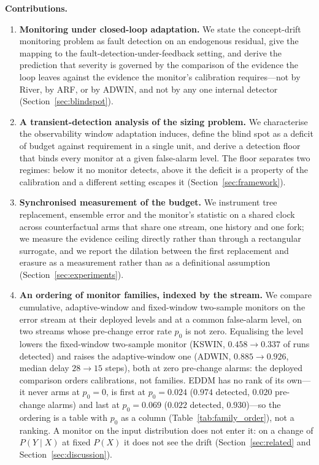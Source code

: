 

\noindent\textbf{Contributions.}
\begin{enumerate}[nosep, label=\textbf{(C\arabic*)}]
  \item \textbf{Monitoring under closed-loop adaptation.} We state the concept-drift monitoring
  problem as fault detection on an endogenous residual, give the mapping to the
  fault-detection-under-feedback setting, and derive the prediction that severity is governed by
  the comparison of the evidence the loop leaves against the evidence the monitor's calibration
  requires---not by River, by ARF, or by ADWIN, and not by any one internal detector
  (Section~\ref{sec:blindspot}).
  \item \textbf{A transient-detection analysis of the sizing problem.} We characterise the
  observability window adaptation induces, define the blind spot as a deficit of budget against
  requirement in a single unit, and derive a detection floor that binds every monitor at a given
  false-alarm level. The floor separates two regimes: below it no monitor detects, above it the
  deficit is a property of the calibration and a different setting escapes it
  (Section~\ref{sec:framework}).
  \item \textbf{Synchronised measurement of the budget.} We instrument tree replacement, ensemble
  error and the monitor's statistic on a shared clock across counterfactual arms that share one
  stream, one history and one fork; we measure the evidence ceiling directly rather than through a
  rectangular surrogate, and we report the dilation between the first replacement and erasure as a
  measurement rather than as a definitional assumption (Section~\ref{sec:experiments}).
  \item \textbf{An ordering of monitor families, indexed by the stream.} We compare cumulative,
  adaptive-window and fixed-window two-sample monitors on the error stream at their deployed
  levels and at a common false-alarm level, on two streams whose pre-change error rate $p_0$ is
  not zero. Equalising the level lowers the fixed-window two-sample monitor (KSWIN, $0.458 \to
  0.337$ of runs detected) and raises the adaptive-window one (ADWIN, $0.885 \to 0.926$, median
  delay $28 \to 15$ steps), both at zero pre-change alarms: the deployed comparison orders
  calibrations, not families. EDDM has no rank of its own---it never arms at $p_0 = 0$, is first
  at $p_0 = 0.024$ ($0.974$ detected, $0.020$ pre-change alarms) and last at $p_0 = 0.069$
  ($0.022$ detected, $0.930$)---so the ordering is a table with $p_0$ as a column
  (Table~\ref{tab:family_order}), not a ranking. A monitor on the input distribution does not
  enter it: on a change of $P(Y \mid X)$ at fixed $P(X)$ it does not see the drift
  (Section~\ref{sec:related} and Section~\ref{sec:discussion}).
\end{enumerate}